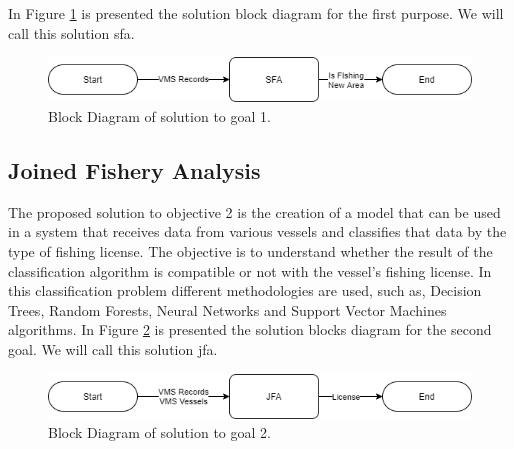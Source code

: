 In Figure \ref{fig:block_sfa} is presented the solution block diagram for the first purpose. We will call this solution \gls{sfa}.


\begin{figure}[H]
\centering
\includegraphics[width=0.8\linewidth]{Chapters/img/Block1-Page-1.png}
\caption{Block Diagram of solution to goal 1.}
\label{fig:block_sfa}
\end{figure}

\subsection{Joined Fishery Analysis} %
\label{sec:int_jfa}

The proposed solution to objective 2 is the creation of a model that can be used in a system that receives data from various vessels and classifies that data by the type of fishing license. The objective is to understand whether the result of the classification algorithm is compatible or not with the vessel's fishing license.
In this classification problem different methodologies are used, such as,  Decision Trees, Random Forests, Neural Networks and Support Vector Machines algorithms.
In Figure \ref{fig:block_jfa} is presented the solution blocks diagram for the second goal.  We will call this solution \gls{jfa}.

\begin{figure}[h]
\centering
\includegraphics[width=0.8\linewidth]{Chapters/img/Block1-Page-2.png}
\caption{Block Diagram of solution to goal 2.}
\label{fig:block_jfa}
\end{figure}

